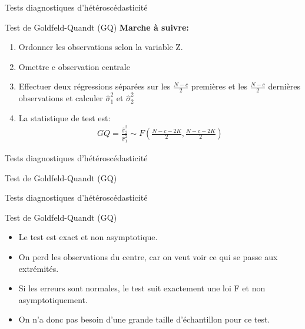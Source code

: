 \documentclass{beamer}
\begin{document}
\begin{frame}{Tests diagnostiques d'hétéroscédasticité}
\begin{block}{Test de Goldfeld-Quandt (GQ)}
\textbf{Marche à suivre:}
\begin{enumerate}
\item Ordonner les observations selon la variable Z.
\item Omettre c observation centrale
\item Effectuer deux régressions séparées sur les $\frac{N-c}{2}$ premières et les $\frac{N-c}{2}$ dernières observations et calculer $\hat{\sigma}_1^2$ et $\hat{\sigma}_2^2$
\item La statistique de test est:
\begin{align*}
GQ = \frac{\hat{\sigma}_2^2}{\hat{\sigma}_1^2} \sim F \left( \frac{N-c-2K}{2}, \frac{N-c-2K}{2}\right)
\end{align*}
\end{enumerate}
\end{block}
\end{frame}


\begin{frame}{Tests diagnostiques d'hétéroscédasticité}
\begin{block}{Test de Goldfeld-Quandt (GQ)}
\end{block}
\end{frame}

\begin{frame}{Tests diagnostiques d'hétéroscédasticité}
\begin{block}{Test de Goldfeld-Quandt (GQ)}
\begin{itemize}
\item Le test est exact et non asymptotique.
\item On perd les observations du centre, car on veut voir ce qui se passe aux extrémités. 
\item Si les erreurs sont normales, le test suit exactement une loi F et non asymptotiquement. 
\item On n’a donc pas besoin d’une grande taille d’échantillon pour ce test.
\end{itemize}
\end{block}
\end{frame}
\end{document}
